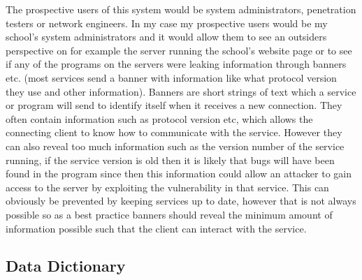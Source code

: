 \documentclass[titlepage]{article}
\let\Oldsubsection\subsection{}
\renewcommand{\subsection}{\FloatBarrier\Oldsubsection}
\begin{document}
The prospective users of this system would be system administrators, penetration testers or network
engineers. In my case my prospective users would be my school's system administrators and it would 
allow them to see an outsiders perspective on for example the \gls{server} running the school's 
website page or to see if any of the programs on the \glspl{server} were leaking information
through \glspl{banner} etc. (most \glspl{service} send a \gls{banner} with information like what
protocol version they use and other information).
Banners are short strings of text which a service or program will send to identify itself when
it receives a new connection. They often contain information such as protocol version etc, which
allows the connecting client to know how to communicate with the service. However they can also
reveal too much information such as the version number of the service running, if the service
version is old then it is likely that bugs will have been found in the program since then
this information could allow an attacker to gain access to the server by exploiting the vulnerability
in that service. This can obviously be prevented by keeping services up to date, however that
is not always possible so as a best practice banners should reveal the minimum amount of information
possible such that the client can interact with the service.

\subsection{Data Dictionary}
\end{document}
